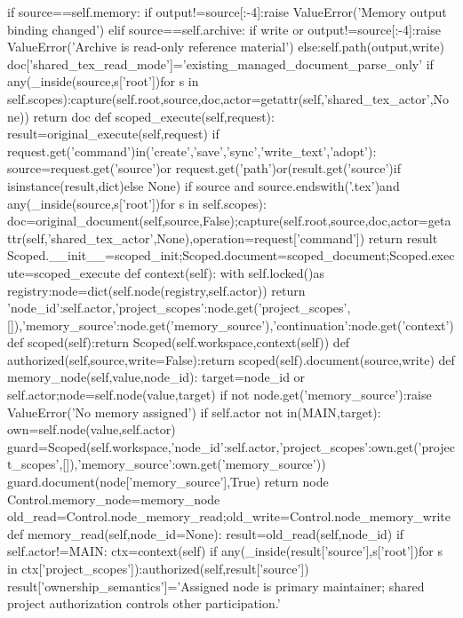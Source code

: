         if source==self.memory:
            if output!=source[:-4]:raise ValueError('Memory output binding changed')
        elif source==self.archive:
            if write or output!=source[:-4]:raise ValueError('Archive is read-only reference material')
        else:self.path(output,write)
        doc['shared_tex_read_mode']='existing_managed_document_parse_only'
        if any(_inside(source,s['root'])for s in self.scopes):capture(self.root,source,doc,actor=getattr(self,'shared_tex_actor',None))
        return doc
    def scoped_execute(self,request):
        result=original_execute(self,request)
        if request.get('command')in('create','save','sync','write_text','adopt'):
            source=request.get('source')or request.get('path')or(result.get('source')if isinstance(result,dict)else None)
            if source and source.endswith('.tex')and any(_inside(source,s['root'])for s in self.scopes):
                doc=original_document(self,source,False);capture(self.root,source,doc,actor=getattr(self,'shared_tex_actor',None),operation=request['command'])
        return result
    Scoped.__init__=scoped_init;Scoped.document=scoped_document;Scoped.execute=scoped_execute
    def context(self):
        with self.locked()as registry:node=dict(self.node(registry,self.actor))
        return {'node_id':self.actor,'project_scopes':node.get('project_scopes',[]),'memory_source':node.get('memory_source'),'continuation':node.get('context')}
    def scoped(self):return Scoped(self.workspace,context(self))
    def authorized(self,source,write=False):return scoped(self).document(source,write)
    def memory_node(self,value,node_id):
        target=node_id or self.actor;node=self.node(value,target)
        if not node.get('memory_source'):raise ValueError('No memory assigned')
        if self.actor not in(MAIN,target):
            own=self.node(value,self.actor)
            guard=Scoped(self.workspace,{'node_id':self.actor,'project_scopes':own.get('project_scopes',[]),'memory_source':own.get('memory_source')})
            guard.document(node['memory_source'],True)
        return node
    Control.memory_node=memory_node
    old_read=Control.node_memory_read;old_write=Control.node_memory_write
    def memory_read(self,node_id=None):
        result=old_read(self,node_id)
        if self.actor!=MAIN:
            ctx=context(self)
            if any(_inside(result['source'],s['root'])for s in ctx['project_scopes']):authorized(self,result['source'])
        result['ownership_semantics']='Assigned node is primary maintainer; shared project authorization controls other participation.'
